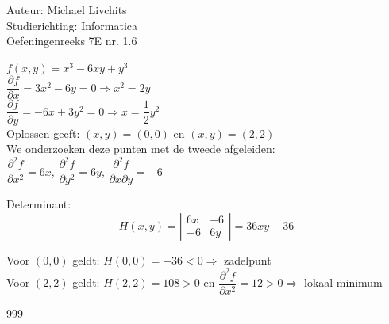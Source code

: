 \documentclass[a4paper]{article}
\begin{document}
  
\noindent \large Auteur: Michael Livchits\\
\noindent \large Studierichting: Informatica\\
\noindent \large Oefeningenreeks 7E nr. 1.6\\

\medskip

\normalsize

$f(x,y) = x^3 - 6xy + y^3$\\

$\dfrac{\partial f}{\partial x} = 3x^2 - 6y = 0 \Rightarrow x^2 = 2y$\\

$\dfrac{\partial f}{\partial y} = -6x + 3y^2 = 0 \Rightarrow x = \dfrac{1}{2} y^2$\\

Oplossen geeft: $(x,y) = (0,0)$ en $(x,y) = (2,2)$\\

We onderzoeken deze punten met de tweede afgeleiden:\\

$\dfrac{\partial^2 f}{\partial x^2} = 6x$,\quad
$\dfrac{\partial^2 f}{\partial y^2} = 6y$,\quad
$\dfrac{\partial^2 f}{\partial x \partial y} = -6$\\

\medskip

Determinant:
\[
H(x,y) = \left|\begin{array}{cc}
6x & -6 \\
-6 & 6y
\end{array}\right| = 36xy - 36
\]

\medskip

Voor $(0,0)$ geldt: $H(0,0) = -36 < 0 \Rightarrow$ zadelpunt\\

Voor $(2,2)$ geldt: $H(2,2) = 108 > 0$ en $\dfrac{\partial^2 f}{\partial x^2} = 12 > 0 \Rightarrow$ lokaal minimum\\

\begin{thebibliography}{999}
\end{thebibliography}
\end{document}
